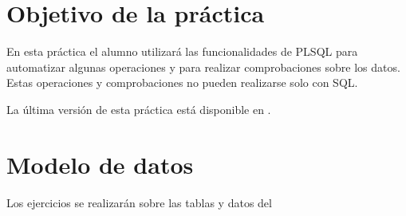 
\usepackage{needspace}




\renewcommand{\hmwkTitle}{Ejercicios inciales PLSQL}
\renewcommand{\hmwkClass}{Gestión de Bases de datos}







\primerapagina


\section{Objetivo de la práctica}
En esta práctica el alumno utilizará las funcionalidades de PLSQL para automatizar algunas operaciones y para realizar comprobaciones sobre los datos. Estas operaciones y comprobaciones no pueden realizarse solo con SQL.

La última versión de esta práctica está disponible en .

\section{Modelo de datos}
Los ejercicios se realizarán sobre las tablas y datos del 



